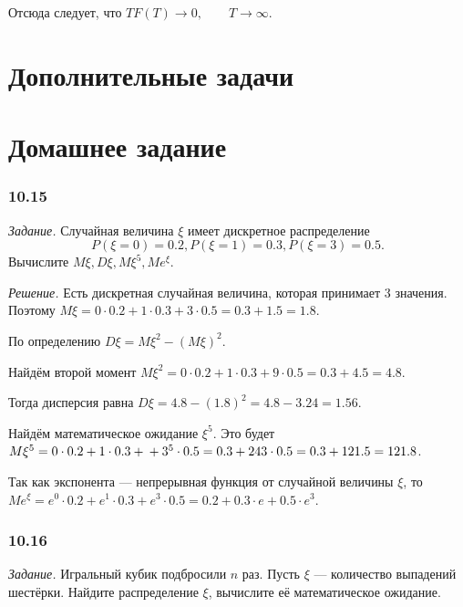 Отсюда следует, что $TF \left( T \right) \rightarrow 0, \qquad T \rightarrow \infty $.

\section*{Дополнительные задачи}

\section*{Домашнее задание}

\subsubsection*{10.15}

\textit{Задание.} Случайная величина $ \xi $ имеет дискретное распределение
$$P \left( \xi = 0 \right) = 0.2,
P \left( \xi = 1 \right) = 0.3,
P \left( \xi = 3 \right) = 0.5.$$
Вычислите $M \xi, D \xi, M \xi^5, Me^{ \xi }$.

\textit{Решение.} Есть дискретная случайная величина, которая принимает 3 значения.
Поэтому $M \xi = 0 \cdot 0.2 + 1 \cdot 0.3 + 3 \cdot 0.5 = 0.3 + 1.5 = 1.8$.

По определению $D \xi = M \xi^2 - \left( M \xi \right)^2$.

Найдём второй момент $M \xi^2 = 0 \cdot 0.2 + 1 \cdot 0.3 + 9 \cdot 0.5 = 0.3 + 4.5 = 4.8$.

Тогда дисперсия равна $D \xi = 4.8 - \left( 1.8 \right)^2 = 4.8 - 3.24 = 1.56$.

Найдём математическое ожидание $ \xi^5$.
Это будет $M \xi^5 = 0 \cdot 0.2 + 1 \cdot 0.3 + \\
+ 3^5 \cdot 0.5 = 0.3 + 243 \cdot 0.5 = 0.3 + 121.5 = 121.8$.

Так как экспонента --- непрерывная функция от случайной величины $ \xi $, то $Me^{ \xi } = e^0 \cdot 0.2 + e^1 \cdot 0.3 + e^3 \cdot 0.5 = 0.2 + 0.3 \cdot e + 0.5 \cdot e^3$.

\subsubsection*{10.16}

\textit{Задание.} Игральный кубик подбросили $n$ раз.
Пусть $ \xi $ --- количество выпадений шестёрки.
Найдите распределение $ \xi $, вычислите её математическое ожидание.

